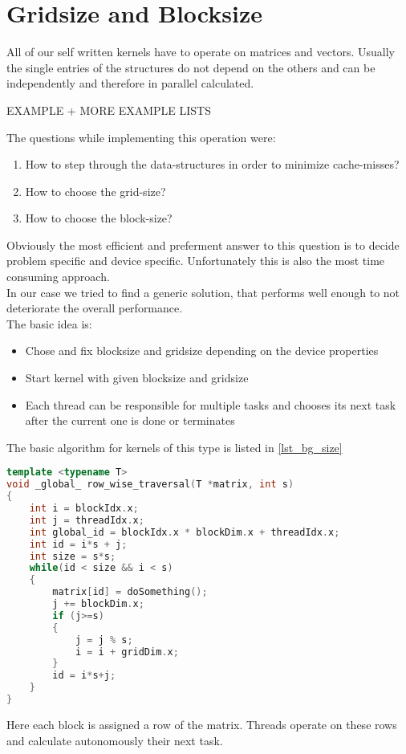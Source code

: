 \section{Gridsize and Blocksize}
All of our self written kernels have to operate on matrices and vectors. Usually the single entries of the structures do not depend on the others and can be independently and therefore in parallel calculated.
\begin{center}
	EXAMPLE + MORE EXAMPLE LISTS
\end{center}
The questions while implementing this operation were:
\begin{enumerate}
	\item How to step through the data-structures in order to minimize cache-misses?
	\item How to choose the grid-size?
	\item How to choose the block-size?
\end{enumerate}

Obviously the most efficient and preferment answer to this question is to decide problem specific and device specific. Unfortunately this is also the most time consuming approach.\\
In our case we tried to find a generic solution, that performs well enough to not deteriorate the overall performance. \\

The basic idea is:
\begin{itemize}
	\item Chose and fix blocksize and gridsize depending on the device properties
	\item Start kernel with given blocksize and gridsize
	\item Each thread can be responsible for multiple tasks and chooses its next task after the current one is done or terminates
\end{itemize}

The basic algorithm  for kernels of this type is listed in \ref{lst_bg_size}

\begin{lstlisting}[caption={\label{lst_bg_size}}, language=cpp]
template <typename T>
void _global_ row_wise_traversal(T *matrix, int s)
{
	int i = blockIdx.x;
	int j = threadIdx.x;
	int global_id = blockIdx.x * blockDim.x + threadIdx.x;
	int id = i*s + j;
	int size = s*s;
	while(id < size && i < s)
	{
		matrix[id] = doSomething();
		j += blockDim.x;
		if (j>=s)
		{
			j = j % s;
			i = i + gridDim.x;
		}
		id = i*s+j;
	}
}
\end{lstlisting}
Here each block is assigned a row of the matrix. Threads operate on these rows and calculate autonomously their next task.

